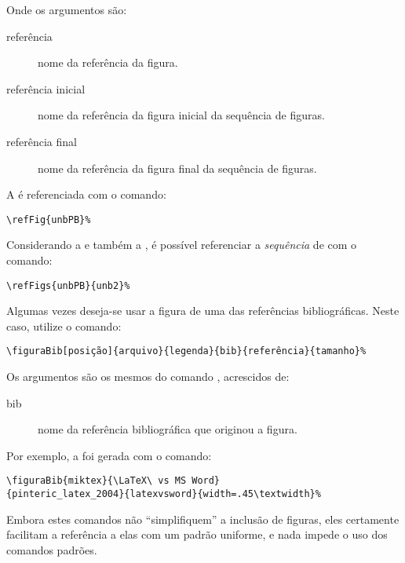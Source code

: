 Onde os argumentos são:
\begin{description}
\item[referência] nome da referência da figura.
\item[referência inicial] nome da referência da figura inicial da sequência de figuras.
\item[referência final] nome da referência da figura final da sequência de figuras.
\end{description}

A  é referenciada com o comando:
\begin{verbatim}
\refFig{unbPB}%
\end{verbatim}

%

Considerando a  e também a , é possível referenciar
a \emph{sequência} de  com o comando:
\begin{verbatim}
\refFigs{unbPB}{unb2}%
\end{verbatim}

Algumas vezes deseja-se usar a figura de uma das referências bibliográficas. Neste caso, utilize o comando:

\begin{verbatim}
\figuraBib[posição]{arquivo}{legenda}{bib}{referência}{tamanho}%
\end{verbatim}

Os argumentos são os mesmos do comando , acrescidos de:
\begin{description}
\item[bib] nome da referência bibliográfica que originou a figura.
\end{description}

Por exemplo, a  foi gerada com o comando:
\begin{verbatim}
\figuraBib{miktex}{\LaTeX\ vs MS Word}
{pinteric_latex_2004}{latexvsword}{width=.45\textwidth}%
\end{verbatim}

Embora estes comandos não ``simplifiquem'' a inclusão de figuras, eles
certamente facilitam a referência a elas com um padrão uniforme, e nada impede o
uso dos comandos padrões.

%



